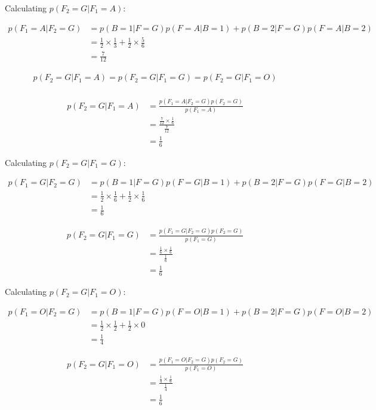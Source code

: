 \documentclass[a4paper]{article}
\begin{document}
Calculating $p(F_2 = G | F_1 = A)$:

\begin{align*}
	p(F_1 = A | F_2 = G) &= p(B = 1| F = G)p(F = A | B = 1) + p(B = 2 | F = G)p(F = A | B = 2)\\
	&= \frac{1}{2} \times \frac{1}{3} +  \frac{1}{2} \times \frac{5}{6}\\
	&= \frac{7}{12}
\end{align*}


\begin{align*}
	p(F_2 = G | F_1 = A) = p(F_2 = G | F_1 = G) = p(F_2 = G | F_1 = O)\\
\end{align*}


\begin{align*}
	p(F_2 = G | F_1 = A) &= \frac{p(F_1 = A | F_2 = G)p(F_2 = G)}{p(F_1 = A)}\\
	&= \frac{\frac{7}{12} \times \frac{1}{6}}{\frac{7}{12}}\\
	&= \frac{1}{6}
\end{align*}


Calculating $p(F_2 = G | F_1 = G)$:

\begin{align*}
	p(F_1 = G | F_2 = G) &=  p(B = 1| F = G)p(F = G | B = 1) + p(B = 2 | F = G)p(F = G | B = 2)\\
	&= \frac{1}{2} \times \frac{1}{6} + \frac{1}{2} \times \frac{1}{6}\\
	&= \frac{1}{6}
\end{align*}

\begin{align*}
	p(F_2 = G | F_1 = G) &= \frac{p(F_1 = G | F_2 = G)p(F_2 = G)}{p(F_1 = G)}\\
	&= \frac{\frac{1}{6} \times \frac{1}{6}}{\frac{1}{6}}\\
	&= \frac{1}{6}
\end{align*}


Calculating $p(F_2 = G | F_1 = O)$:

\begin{align*}
	p(F_1 = O | F_2 = G) &= p(B = 1| F = G)p(F = O | B = 1) + p(B = 2 | F = G)p(F = O | B = 2)\\
	&= \frac{1}{2} \times \frac{1}{2} +  \frac{1}{2} \times 0\\
	&= \frac{1}{4}
\end{align*}

\begin{align*}
	p(F_2 = G | F_1 = O) &= \frac{p(F_1 = O | F_2 = G)p(F_2 = G)}{p(F_1 = O)}\\
	&= \frac{\frac{1}{4} \times \frac{1}{6}}{\frac{1}{4}}\\
	&= \frac{1}{6}
\end{align*}
\end{document}
